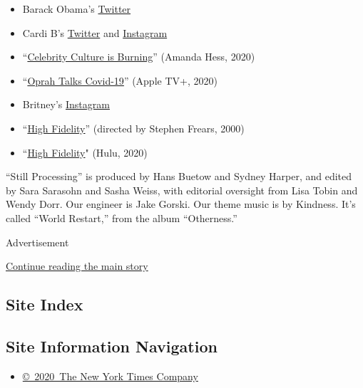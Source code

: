 \begin{itemize}
\item
  Barack Obama's \href{https://twitter.com/BarackObama}{Twitter}
\item
  Cardi B's \href{https://twitter.com/iamcardib}{Twitter} and
  \href{https://www.instagram.com/iamcardib/}{Instagram}
\item
  ``\href{https://www.nytimes3xbfgragh.onion/2020/03/30/arts/virus-celebrities.html}{Celebrity
  Culture is Burning}'' (Amanda Hess, 2020)
\item
  ``\href{https://tv.apple.com/us/show/oprah-talks-covid-19/umc.cmc.1xr8rwhaw9pkks7bvzy44dezt}{Oprah
  Talks Covid-19}'' (Apple TV+, 2020)
\item
  Britney's \href{https://www.instagram.com/p/B-FppKxAFxm/}{Instagram}
\item
  ``\href{https://www.imdb.com/title/tt0146882/}{High Fidelity}''
  (directed by Stephen Frears, 2000)
\item
  ``\href{https://www.hulu.com/series/high-fidelity-52cb09be-ccc9-4eb4-9db8-f00b0443b2f5}{High
  Fidelity}" (Hulu, 2020)
\end{itemize}

``Still Processing'' is produced by Hans Buetow and Sydney Harper, and
edited by Sara Sarasohn and Sasha Weiss, with editorial oversight from
Lisa Tobin and Wendy Dorr. Our engineer is Jake Gorski. Our theme music
is by Kindness. It's called ``World Restart,'' from the album
``Otherness.''

Advertisement

\protect\hyperlink{after-bottom}{Continue reading the main story}

\hypertarget{site-index}{%
\subsection{Site Index}\label{site-index}}

\hypertarget{site-information-navigation}{%
\subsection{Site Information
Navigation}\label{site-information-navigation}}

\begin{itemize}
\tightlist
\item
  \href{https://help.nytimes3xbfgragh.onion/hc/en-us/articles/115014792127-Copyright-notice}{©~2020~The
  New York Times Company}
\end{itemize}

